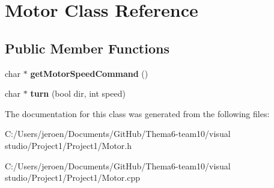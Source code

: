 \hypertarget{class_motor}{}\section{Motor Class Reference}
\label{class_motor}
\subsection*{Public Member Functions}
\begin{DoxyCompactItemize}
\item 
char $\ast$ {\bfseries get\+Motor\+Speed\+Command} ()\hypertarget{class_motor_a0b0c86d75972d5c6ac476cefa10e19f9}{}\label{class_motor_a0b0c86d75972d5c6ac476cefa10e19f9}

\item 
char $\ast$ {\bfseries turn} (bool dir, int speed)\hypertarget{class_motor_a2fc83f6c475021bf0d3c4c8a2736cea4}{}\label{class_motor_a2fc83f6c475021bf0d3c4c8a2736cea4}

\end{DoxyCompactItemize}


The documentation for this class was generated from the following files\+:\begin{DoxyCompactItemize}
\item 
C\+:/\+Users/jeroen/\+Documents/\+Git\+Hub/\+Thema6-\/team10/visual studio/\+Project1/\+Project1/Motor.\+h\item 
C\+:/\+Users/jeroen/\+Documents/\+Git\+Hub/\+Thema6-\/team10/visual studio/\+Project1/\+Project1/Motor.\+cpp\end{DoxyCompactItemize}
